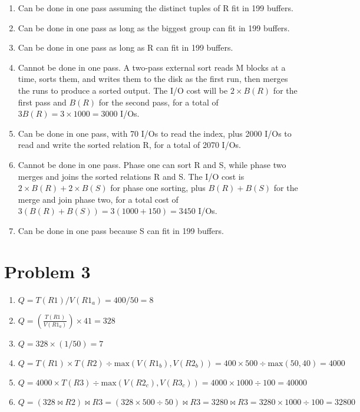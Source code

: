 \documentclass[a4paper, 12pt]{article}
\begin{document}
\begin{enumerate}[label=(\alph*)]
	\item Can be done in one pass assuming the distinct tuples of R fit in 199
		buffers.
	\item Can be done in one pass as long as the biggest group can fit in 199
		buffers.
	\item Can be done in one pass as long as R can fit in 199 buffers.
	\item Cannot be done in one pass. A two-pass external sort reads M blocks at
		a time, sorts them, and writes them to the disk as the first run, then
		merges the runs to produce a sorted output. The I/O cost will be $ 2
		\times B(R) $ for the first pass and $ B(R) $ for the second pass, for a
		total of $ 3 B(R) = 3 \times 1000 = 3000 $ I/Os.
	\item Can be done in one pass, with 70 I/Os to read the index, plus 2000
		I/Os to read and write the sorted relation R, for a total of 2070 I/Os.
	\item Cannot be done in one pass. Phase one can sort R and S, while phase
		two merges and joins the sorted relations R and S. The I/O cost is $ 2
		\times B(R) + 2 \times B(S) $ for phase one sorting, plus $ B(R) + B(S)
		$ for the merge and join phase two, for a total cost of $ 3 ( B(R) +
		B(S)) = 3 ( 1000 + 150 ) = 3450 $ I/Os.
	\item Can be done in one pass because S can fit in 199 buffers.
\end{enumerate}

\section*{Problem 3}

\begin{enumerate}
	\item $ Q = T(R1) / V(R1_a) = 400 / 50 = 8 $
	\item $ Q = \left ( \frac{T(R1)}{V(R1_a)} \right ) \times 41 = 328 $
	\item $ Q = 328 \times (1 / 50) = 7 $
	\item $ Q = T(R1) \times T(R2) \div \text{max}(V(R1_b), V(R2_b)) = 400
		\times 500 \div \text{max}(50, 40) = 4000 $
	\item $ Q = 4000 \times T(R3) \div \text{max}(V(R2_c), V(R3_c)) = 4000
		\times 1000 \div 100 = 40000 $
	\item $ Q = ( 328 \bowtie R2 ) \bowtie R3 = ( 328 \times 500 \div 50 )
		\bowtie R3 = 3280 \bowtie R3 = 3280 \times 1000 \div 100 = 32800 $
\end{enumerate}
\end{document}
